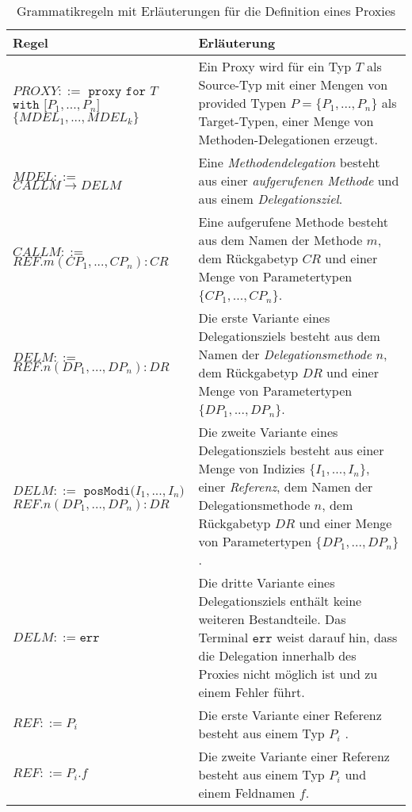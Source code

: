 \begin{table}[H]
\centering
\begin{tabular}{|p{5cm}|p{9cm}|}
\hline
\hline
\centering\textbf{Regel} & \textbf{Erläuterung} \\
\hline
\hline
$\mathit{PROXY} ::=$\newline
$\texttt{proxy } \texttt{for } T$\newline
$ \texttt{with [}\mathit{P_1},...,\mathit{P_n}\texttt{]}$ \newline
$\texttt{\{}\mathit{MDEL_1},...,\mathit{MDEL_k} \texttt{\}}$
 & Ein Proxy wird für ein Typ $T$ als Source-Typ mit einer Mengen von provided Typen $P = \{P_1,...,P_n\}$ als Target-Typen, einer Menge von Methoden-Delegationen erzeugt.\\
\hline
$\mathit{MDEL} ::=$\newline
$CALLM \rightarrow DELM $  & Eine \emph{Methodendelegation} besteht aus einer \emph{aufgerufenen Methode} und aus einem \emph{Delegationsziel}.\\
\hline
$\mathit{CALLM} ::=$\newline 
$\mathit{REF}.\mathit{m(\mathit{CP_1},...,\mathit{CP_n}):CR} $  & Eine aufgerufene Methode besteht aus dem Namen der Methode $m$, dem Rückgabetyp $\mathit{CR}$ und einer Menge von Parametertypen $\{\mathit{CP_1},...,\mathit{CP_n}\}$.\\
\hline
$\mathit{DELM} ::=$\newline 
$\mathit{REF}.\mathit{n(\mathit{DP_1},...,\mathit{DP_n}):DR} $  
& Die erste Variante eines Delegationsziels besteht aus  dem Namen der \emph{Delegationsmethode} $n$, dem Rückgabetyp $\mathit{DR}$ und einer Menge von Parametertypen $\{\mathit{DP_1},...,\mathit{DP_n}\}$.\\
\hline
$\mathit{DELM} ::=$\newline
$\texttt{posModi(} \mathit{I_1},...,\mathit{I_n} \texttt{)}$\newline
$\mathit{REF}.\mathit{n(\mathit{DP_1},...,\mathit{DP_n}):DR} $  
& Die zweite Variante eines Delegationsziels besteht aus einer Menge von Indizies $\{\mathit{I_1},...,\mathit{I_n}\}$, einer \emph{Referenz}, dem Namen der Delegationsmethode $n$, dem Rückgabetyp $\mathit{DR}$ und einer Menge von Parametertypen $\{\mathit{DP_1},...,\mathit{DP_n}\}$.\\
\hline
$\mathit{DELM} ::= \texttt{err} $  
& Die dritte Variante eines Delegationsziels enthält keine weiteren Bestandteile. Das Terminal $\texttt{err}$ weist darauf hin, dass die Delegation innerhalb des Proxies nicht möglich ist und zu einem Fehler führt.\\
\hline
$\mathit{REF} ::= \mathit{P_i}$
& Die erste Variante einer Referenz besteht aus einem Typ $P_i$ .\\
\hline
$\mathit{REF} ::= \mathit{P_i}\texttt{.}\mathit{f}$
& Die zweite Variante einer Referenz besteht aus einem Typ $P_i$ und einem Feldnamen $f$.\\
\hline
\end{tabular}
\caption{Grammatikregeln mit Erläuterungen für die Definition eines Proxies}
 \label{tab:grProxies}
\end{table}
